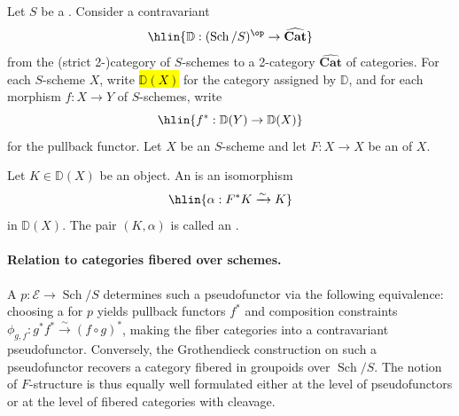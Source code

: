 \begin{definition} \label{definition:f_structure_on_an_object_of_a_pseudofunctorial_category_over_schemes_for_an_endomorphism}
    Let $S$ be a . Consider a contravariant 
    $$\hlin{\mathbb{D}: (\operatorname{Sch}/S)^{\op} \to \widehat{\mathbf{Cat}}}$$
    from the (strict 2-)category of $S$-schemes to a 2-category $\widehat{\mathbf{Cat}}$ of categories. For each $S$-scheme $X$, write \hl{$\mathbb{D}(X)$} for the category assigned by $\mathbb{D}$, and for each morphism $f: X \to Y$ of $S$-schemes, write
    $$\hlin{f^*: \mathbb{D}(Y) \to \mathbb{D}(X)}$$
    for the pullback functor. Let $X$ be an $S$-scheme and let $F: X \to X$ be an  of $X$.

    Let $K \in \mathbb{D}(X)$ be an object. An  is an isomorphism
    $$\hlin{\alpha: F^*K \xrightarrow{\sim} K}$$
    in $\mathbb{D}(X)$. The pair $(K, \alpha)$ is called an .

    \paragraph{Relation to categories fibered over schemes.} A  $p: \mathcal{E} \to \operatorname{Sch}/S$ determines such a pseudofunctor via the following equivalence: choosing a  for $p$ yields pullback functors $f^*$ and composition constraints $\phi_{g,f}: g^* f^* \xrightarrow{\sim} (f \circ g)^*$, making the fiber categories into a contravariant pseudofunctor. Conversely, the Grothendieck construction on such a pseudofunctor recovers a category fibered in groupoids over $\operatorname{Sch}/S$. The notion of $F$-structure is thus equally well formulated either at the level of pseudofunctors or at the level of fibered categories with cleavage.


\end{definition}
